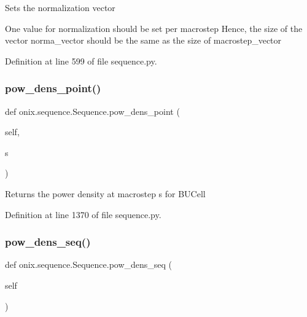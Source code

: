 \begin{DoxyVerb}Sets the normalization vector

One value for normalization should be set per macrostep
Hence, the size of the vector norma_vector should be the same
as the size of macrostep_vector
\end{DoxyVerb}
 

Definition at line 599 of file sequence.\+py.

\mbox{\label{classonix_1_1sequence_1_1Sequence_add32b009bcb9686326857ba0b775a455}} 
\subsubsection{\texorpdfstring{pow\+\_\+dens\+\_\+point()}{pow\_dens\_point()}}
{\footnotesize\ttfamily def onix.\+sequence.\+Sequence.\+pow\+\_\+dens\+\_\+point (\begin{DoxyParamCaption}\item[{}]{self,  }\item[{}]{s }\end{DoxyParamCaption})}

\begin{DoxyVerb}Returns the power density at macrostep s for BUCell\end{DoxyVerb}
 

Definition at line 1370 of file sequence.\+py.

\mbox{\label{classonix_1_1sequence_1_1Sequence_a230e31e518e64a65e3ea13a677dd2ca0}} 
\subsubsection{\texorpdfstring{pow\+\_\+dens\+\_\+seq()}{pow\_dens\_seq()}\hspace{0.1cm}{\footnotesize\ttfamily [1/2]}}
{\footnotesize\ttfamily def onix.\+sequence.\+Sequence.\+pow\+\_\+dens\+\_\+seq (\begin{DoxyParamCaption}\item[{}]{self }\end{DoxyParamCaption})}

